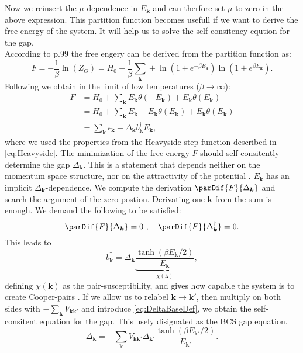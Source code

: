 \documentclass[../main.tex]{subfile}
\begin{document}
Now we reinsert the $\mu$-dependence in $E_{\bm{k}}$ and can therfore set $\mu$ to zero in the above expression.
This partition function becomes usefull if we want to derive the free energy of the system. It will help us to solve the self consitency eqution for the gap.\\
According to \cite{FuchsBaugaertel2023} p.99 the free engery can be derived from the partition function as:
\[
    F = -\frac{1}{\beta}\ln(Z_G) = H_0 -\frac{1}{\beta}\sum_{\bm{k}} + \ln\left(1 + e^{-\beta E_{\bm{k}}}\right)\ln\left(1 + e^{\beta E_{\bm{k}}}\right).
\]
Following \cite{FossheimSudbo2004} we obtain in the limit of low temperatures ($\beta\rightarrow \infty$):
\begin{align*}
    F &= H_0 + \sum_{\bm{k}} E_{\bm{k}} \theta\left(-E_{\bm{k}}\right) + E_{\bm{k}} \theta\left(E_{\bm{k}}\right)\\
      &= H_0 + \sum_{\bm{k}} E_{\bm{k}} - E_{\bm{k}}\theta\left(E_{\bm{k}}\right) + E_{\bm{k}} \theta\left(E_{\bm{k}}\right)\\
      &= \sum_{\bm{k}} \epsilon_{\bm{k}} + \Delta_{\bm{k}}b_{\bm{k}}^{\dagger} E_{\bm{k}},
\end{align*}
where we used the properties from the Heavyside step-function described in \ref{eq:Heavyside}.
The minimization of the free energy $F$ should self-consitently determine the gap $\Delta_{\bm{k}}$. This is a statement that depends neither on the momentum space structure,
nor on the attractivity of the potential \cite{FossheimSudbo2004}. $E_{\bm{k}}$ has an implicit $\Delta_{\bm{k}}$-dependence.
We compute the derivation $\parDif{F}{\Delta_{\bm{k}}}$ and search the argument of the zero-postion. Derivating one $\bm{k} $ from the sum is enough. We demand the following
to be satisfied:
\begin{equation}
    \parDif{F}{\Delta_{\bm{k}}} = 0 ~,~~~ \parDif{F}{\Delta_{\bm{k}}^{\dagger}} = 0.
\end{equation}
This leads to 
\begin{equation*}
    b_{\bm{k}}^{\dagger} = \Delta_{\bm{k}} \underbrace{\frac{\tanh(\beta E_{\bm{k}}/2)}{E_{\bm{k}}}}_{\chi(\bm{k})},
\end{equation*}
defining $\chi(\bm{k})$ as the pair-susceptibility, and gives how capable the system is to create Cooper-pairs \cite{FossheimSudbo2004}. If we allow us to relabel 
$\bm{k}\rightarrow\bm{k}'$, then multiply on both sides
with $-\sum_{\bm{k}} V_{\bm{k}\bm{k}'}$ and introduce \ref{eq:DeltaBaseDef}, we obtain the self-consitent equation for the gap. This usely disignated as the BCS gap equation.
\begin{equation}\label{eq:BCS_gap_eq}
    \Delta_{\bm{k}} = -\sum_{\bm{k}} V_{\bm{k}\bm{k}'} \Delta_{\bm{k}'}\frac{\tanh(\beta E_{\bm{k}'}/2)}{E_{\bm{k}'}}.
\end{equation}
\end{document}

